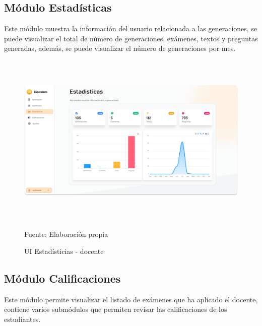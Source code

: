 \documentclass[../Main.tex]{subfiles}
\begin{document}
    \subsection{Módulo Estadísticas}
    \begin{justify}
    Este módulo muestra la información del usuario relacionada a las generaciones, se puede visualizar el total de número de generaciones, exámenes, textos y preguntas generadas, además, se puede visualizar el número de generaciones por mes. 
    \end{justify}
    
    \begin{figure}[H]
	\begin{Center}
		\includegraphics[width=6.4in,height=3.3in]{Images/ui_docente_estadisticas.png}
	    \caption{UI Estadísticias - docente}
	    Fuente: Elaboración propia
        \label{fig:section}
	\end{Center}
    \end{figure}
    
    \subsection{Módulo Calificaciones}
    \begin{justify}
    Este módulo permite visualizar el listado de exámenes que ha aplicado el docente, contiene varios submódulos que permiten revisar las calificaciones de los estudiantes. 
    \end{justify}
    
\end{document}
